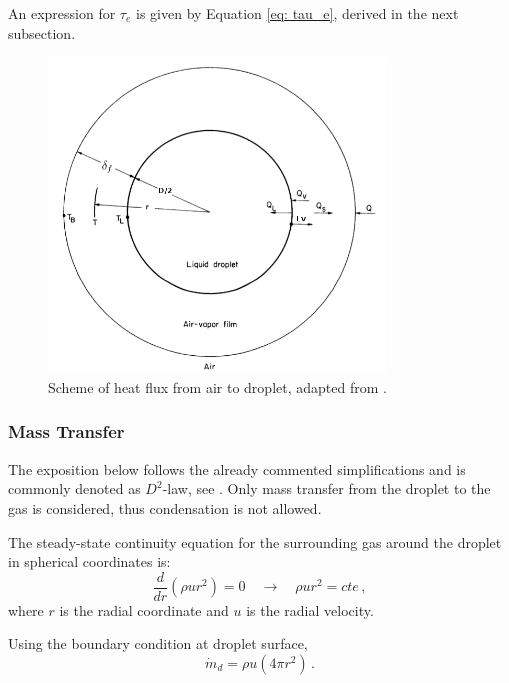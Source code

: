 An expression for $\tau_e$ is given by Equation \eqref{eq: tau_e}, derived in the next subsection.

\begin{figure}
 \centering
 \includegraphics[width=0.8\textwidth]{./figuras/chap2/droplet_heat.png} 
 \caption{Scheme of heat flux from air to droplet, adapted from \cite{naca}.}
 \label{fig: drop_heat}
\end{figure}


\subsubsection{Mass Transfer}

The exposition below follows the already commented simplifications and is commonly denoted as $D^2$-law, see \cite{sirignano}.
Only mass transfer from the droplet to the gas is considered, thus condensation is not allowed.

The steady-state continuity equation for the surrounding gas around the droplet in spherical coordinates is:
\begin{equation}\label{eq: film_mass}
 \frac{d}{d r} \left( \rho u r^2 \right) = 0 \quad \rightarrow \quad \rho u r^2 = cte \, ,
\end{equation}
where $r$ is the radial coordinate and $u$ is the radial velocity.

Using the boundary condition at droplet surface,
\begin{equation}\label{eq: film_species_bc}
 \dot{m}_d = \rho u \left( 4\pi r^2  \right) \, .
\end{equation}
 

